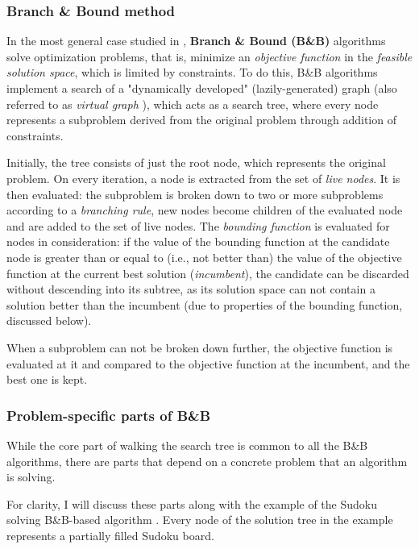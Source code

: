 \subsubsection{Branch \& Bound method}

In the most general case studied in \cite{clausen1999principles}, \textbf{Branch \& Bound (B\&B)}
algorithms solve optimization problems, that is, minimize an \emph{objective function} in the
\emph{feasible solution space}, which is limited by constraints. To do this, B\&B algorithms
implement a search of a "dynamically developed" (lazily-generated) graph
(also referred to as \emph{virtual graph}
    \cite{shilov2011rutemplateverif} \cite{shilov2012verifmono}),
which acts as a search tree, where every node represents a subproblem derived from the
original problem through addition of constraints.

Initially, the tree consists of just the root node, which represents the original problem.
On every iteration, a node is extracted from the set of \emph{live nodes}.
It is then evaluated: the subproblem is broken down to
two \cite{narkawicz2013formalnasa} or more \cite{clausen1999principles}
subproblems according to a
\emph{branching rule}, new nodes become children of the evaluated node and are added
to the set of live nodes. The \emph{bounding function} is evaluated for nodes in
consideration: if the value of the bounding function at the candidate node is greater than
or equal to (i.e., not better than) the value of the objective function at the current
best solution (\emph{incumbent}), the candidate can be discarded without descending into
its subtree, as its solution space can not contain a solution better than the incumbent
(due to properties of the bounding function, discussed below).

When a subproblem can not be broken down further, the objective function is evaluated at
it and compared to the objective function at the incumbent, and the best one is kept.

\subsubsection{Problem-specific parts of B\&B}

While the core part of walking the search tree is common to all the B\&B algorithms,
there are parts that depend on a concrete problem that an algorithm is solving.

For clarity, I will discuss these parts along with the example of the Sudoku solving
B\&B-based algorithm \cite{indriyono2024sudoku}. Every node of the solution tree
in the example represents a partially filled Sudoku board.

